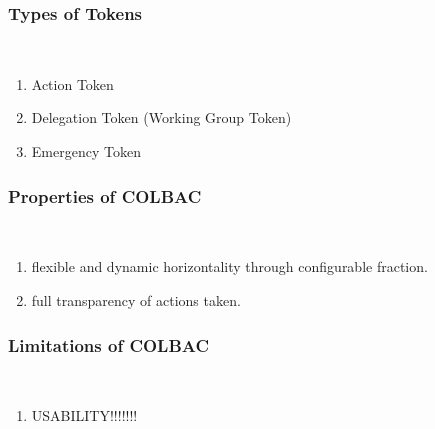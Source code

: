\subsubsection{Types of Tokens}
\mbox{}\\
\begin{enumerate}
\item Action Token
\item Delegation Token (Working Group Token)
\item Emergency Token
\end{enumerate}

\subsubsection{Properties of COLBAC}
\mbox{}\\
\begin{enumerate}
\item flexible and dynamic horizontality through configurable fraction.
\item full transparency of actions taken.
\end{enumerate}

\subsubsection{Limitations of COLBAC}
\mbox{}\\
\begin{enumerate}
\item USABILITY!!!!!!!
\end{enumerate}






